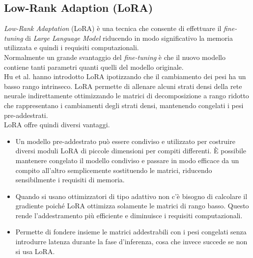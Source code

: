 \subsection{Low-Rank Adaption (LoRA)}
\emph{Low-Rank Adaptation} (LoRA) \cite{hu2021loralowrankadaptationlarge} \`e una tecnica che consente di effettuare il \emph{fine-tuning} di \emph{Large Language Model} riducendo in modo significativo la memoria utilizzata e quindi i requisiti computazionali.\\
Normalmente un grande svantaggio del \emph{fine-tuning} \`e che il nuovo modello contiene tanti parametri quanti quelli del modello originale.\\
Hu et al. \cite{hu2021loralowrankadaptationlarge} hanno introdotto LoRA ipotizzando che il cambiamento dei pesi ha un basso rango intrinseco. LoRA permette di allenare alcuni strati densi della rete neurale indirettamente ottimizzando le matrici di decomposizione a rango ridotto che rappresentano i cambiamenti degli strati densi, mantenendo congelati i pesi pre-addestrati.\\
LoRA offre quindi diversi vantaggi.
\begin{itemize}
    \item Un modello pre-addestrato pu\`o essere condiviso e utilizzato per costruire diversi moduli LoRA di piccole dimensioni per compiti differenti. \`E possibile mantenere congelato il modello condiviso e passare in modo efficace da un compito all'altro semplicemente sostituendo le matrici, riducendo sensibilmente i requisiti di memoria.
    \item Quando si usano ottimizzatori di tipo adattivo non c'\`e bisogno di calcolare il gradiente poich\'e LoRA ottimizza solamente le matrici di rango basso. Questo rende l'addestramento pi\`u efficiente e diminuisce i requisiti computazionali.
    \item Permette di fondere insieme le matrici addestrabili con i pesi congelati senza introdurre latenza durante la fase d'inferenza, cosa che invece succede se non si usa LoRA.
\end{itemize}

